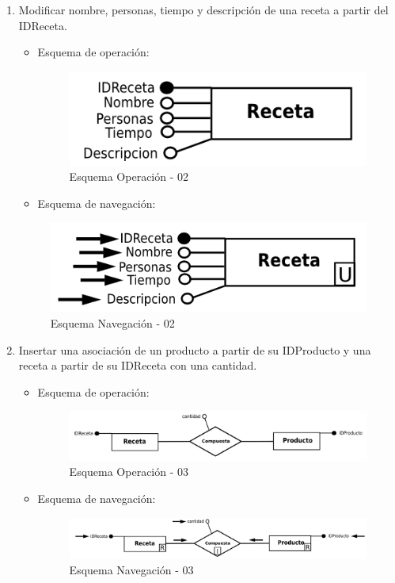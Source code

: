 \documentclass[a4paper,12pt]{report}
\begin{document}
\begin{enumerate}
\item Modificar nombre, personas, tiempo y descripción de una receta
a partir del IDReceta.
\begin{itemize}
\item Esquema de operación:
\begin{figure}[!htp]
\centering
\includegraphics[width=0.5\linewidth]{./operaciones/img/Recetas/02_ope.png}
\caption{Esquema Operación - 02}
\label{fig:ope02}
\medskip
\footnotesize
{}
\end{figure}
\item Esquema de navegación:
\end{itemize}
\begin{figure}[!htp]
\centering
\includegraphics[width=0.5\linewidth]{./operaciones/img/Recetas/02_nav.png}
\caption{Esquema Navegación - 02}
\label{fig:nave02}
\medskip
\footnotesize
{}
\end{figure}

\item Insertar una asociación de un producto a partir de su
IDProducto y una receta a partir de su IDReceta con una
cantidad.
\begin{itemize}
\item Esquema de operación:
\begin{figure}[!htp]
\centering
\includegraphics[width=0.9\linewidth]{./operaciones/img/Recetas/03_ope.png}
\caption{Esquema Operación - 03}
\label{fig:ope03}
\medskip
\footnotesize
{}
\end{figure}
\item Esquema de navegación:
\begin{figure}[!htp]
\centering
\includegraphics[width=0.9\linewidth]{./operaciones/img/Recetas/03_nav.png}
\caption{Esquema Navegación - 03}
\label{fig:nave03}
\medskip
\footnotesize
{}
\end{figure}
\end{itemize}


\end{enumerate}
\end{document}
